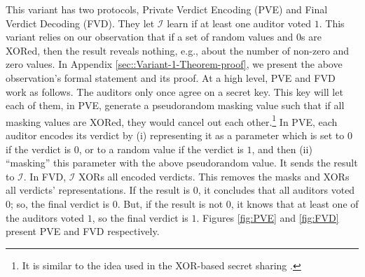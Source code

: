 This variant has two protocols,  Private Verdict Encoding (PVE) and Final Verdict Decoding (FVD). They let $\mathcal{I}$ learn if at least one auditor voted $1$. This variant relies on our observation that if a set of random values and $0$s are XORed, then the result reveals nothing, e.g.,  about the number of non-zero and zero values. In Appendix \ref{sec::Variant-1-Theorem-proof}, we present the above observation's formal statement and its proof. At a high level, PVE and FVD work as follows.  The auditors only once agree on a secret key. This key will let each of them, in PVE,  generate a pseudorandom masking value such that if all masking values are XORed, they would cancel out each other.\footnote{It is similar to the idea used in the XOR-based secret sharing \cite{Schneier0078909}.} In PVE, each auditor encodes its verdict by (i) representing it as a parameter which is set to  $0$ if the verdict is $0$, or to a random value if the verdict is $1$, and then (ii) ``masking'' this parameter with the above pseudorandom value.  It sends the result to $\mathcal{I}$.  In FVD,  $\mathcal{I}$   XORs all encoded verdicts. This removes the masks and XORs all verdicts' representations.  If the result is $0$,   it concludes that all auditors voted $0$; so,  the final verdict is $0$. But, if the result is not $0$,  it knows that at least one of the auditors voted $1$, so the final verdict is $1$. Figures \ref{fig:PVE} and \ref{fig:FVD} present  PVE and FVD respectively.  %


 
